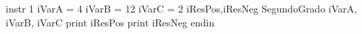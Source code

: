 instr 1
iVarA = 4
iVarB = 12
iVarC = 2
iResPos,iResNeg  SegundoGrado iVarA, iVarB, iVarC
print iResPos
print iResNeg
endin